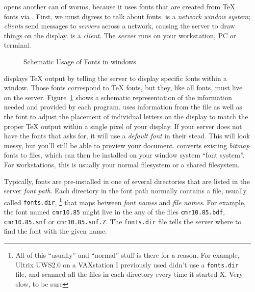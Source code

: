 {\xtex} opens another can of worms, because it uses
{\X} fonts that are created from {\TeX} fonts via {\mftobdf}.
First, we must digress to talk about {\X} fonts.
{\X} is a {\em network window system}; {\em clients} send messages to
{\em servers} across a network, causing the server to draw things on
the display.
{\xtex} is a {\em client}.
The {\em server} runs on your workstation, PC or terminal.

\begin{figure}
\centerline{}
\caption{Schematic Usage of Fonts in {\X} windows}  
\label{figure:schematic}
\end{figure}


{\xtex} displays {\TeX} output by telling the server to display
specific fonts within a window. Those fonts correspond to {\TeX}
fonts, but they, like all {\X} fonts, must live on the server.
Figure~\ref{figure:schematic} shows a schematic representation
of the information needed and provided by each program.
{\xtex} uses information from the {\TFM} file as well as the {\X} font
to adjust the placement of individual letters on the display to
match the proper {\TeX} output within a single pixel of your display.
If your server does not have the fonts that {\xtex} asks for, it will
use a {\em default font} in their stead. This will look messy, but
you'll still be able to preview your document.
{\mftobdf} converts existing {\em bitmap} fonts to {\BDF} files,
which can then be installed on your {\X} window system ``font system''.
For workstations, this is usually your normal filesystem or a shared
filesystem.


Typically, fonts are pre-installed in one of several directories
that are listed in the server {\em font path}.
Each directory in the font path normally contains a file,
usually called {\tt fonts.dir},%
\footnote{All of this ``usually'' and ``normal'' stuff is there for a reason.
For example, Ultrix UWS2.0 on a VAXstation I previously used didn't use a
{\tt fonts.dir} file, and scanned all the files in each directory every time
it started X. Very slow, to be sure}%
that maps between {\em font names} and {\em file names}.
For example, the font named {\tt cmr10.85} might live
in the any of the files {\tt cmr10.85.bdf}, {\tt cmr10.85.snf}
or {\tt cmr10.85.snf.Z}. The {\tt fonts.dir} file tells the
{\X} server where to find the font with the given name.

